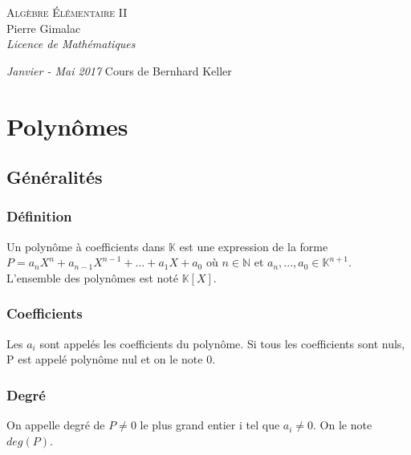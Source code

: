 \documentclass[a4paper,10pt]{book} %
\newcommand{\N}{\mathbb{N}}
\newcommand{\K}{\mathbb{K}}
\begin{document}
\begin{titlepage}
\thispagestyle{empty}
\begin{center}
\vspace*{7cm}
\Huge \textsc{Algèbre Élémentaire II}\\
\vspace{1.5cm}
\Large Pierre Gimalac\\
\vspace{0.5cm}
\large \textit{Licence de Mathématiques}
\vfill
\end{center}
\large \textit{Janvier - Mai 2017}
\hfill
\large Cours de Bernhard Keller
\restoregeometry
\end{titlepage}

\renewcommand{\contentsname}{Sommaire}
\thispagestyle{empty}
\tableofcontents
\thispagestyle{empty}


\setcounter{MaxMatrixCols}{13}

\chapter{Polynômes}
\section{Généralités}
\subsection{Définition}
Un polynôme à coefficients dans $\K$ est une expression de la forme\\
$P=a_{n}X^{n}+a_{n-1}X^{n-1}+...+a_{1}X+a_{0}$ où $n \in \N$ et $a_{n},...,a_{0} \in \K^{n+1}$.\\

L'ensemble des polynômes est noté $\K[X]$.

\subsection{Coefficients}
Les $a_{i}$ sont appelés les coefficients du polynôme. Si tous les coefficients sont nuls,\\
P est appelé polynôme nul et on le note 0.

\subsection{Degré}
On appelle degré de $P\neq 0$ le plus grand entier i tel que $a_{i}\neq 0$. On le note $deg(P)$.\\
\end{document}
